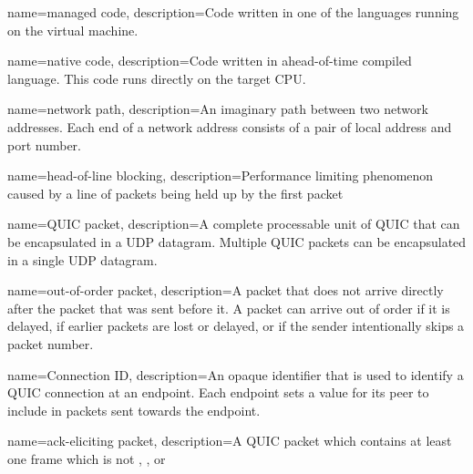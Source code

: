 \makeglossaries


\renewcommand{\glsnamefont}[1]{\makefirstuc{#1}}

\newcommand{\newdefinedabbreviation}[4]{
    \newglossaryentry{#1}
    {
        text={#2},
        long={#3},
        name={#3 (#2)},
        first={#3 (#2)},
        firstplural={\glsentrylong{#1}\glspluralsuffix (\glsentryname{#1}\glspluralsuffix )},
        description={#4}
    }
}

{
  name=managed code,
  description={Code written in one of the \dotnet{} languages running on the \dotnet{} virtual machine.}
}

{
  name=native code,
  description={Code written in ahead-of-time compiled language. This code runs directly on the target CPU.}
}

{
    name=network path,
    description={An imaginary path between two network addresses. Each end of a network address consists of a pair of local address and port number.}
}

{
    name=head-of-line blocking,
    description={Performance limiting phenomenon caused by a line of packets being held up by the first packet}
}

{
    name=QUIC packet,
    description={A complete processable unit of QUIC that can be
  encapsulated in a UDP datagram.  Multiple QUIC packets can be
  encapsulated in a single UDP datagram.}
}

{
  name=out-of-order packet,
  description={A packet that does not arrive directly after the packet that was
  sent before it.  A packet can arrive out of order if it is delayed, if earlier packets are
  lost or delayed, or if the sender intentionally skips a packet number.}
}

{
  name=Connection ID,
  description={An opaque identifier that is used to identify a QUIC
  connection at an endpoint.  Each endpoint sets a value for its
  peer to include in packets sent towards the endpoint.}
}

{
  name=ack-eliciting packet,
  description={A QUIC packet which contains at least one frame which is not \PADDING{},  \ACK{}, or \CONNECTIONCLOSE{}}
}

